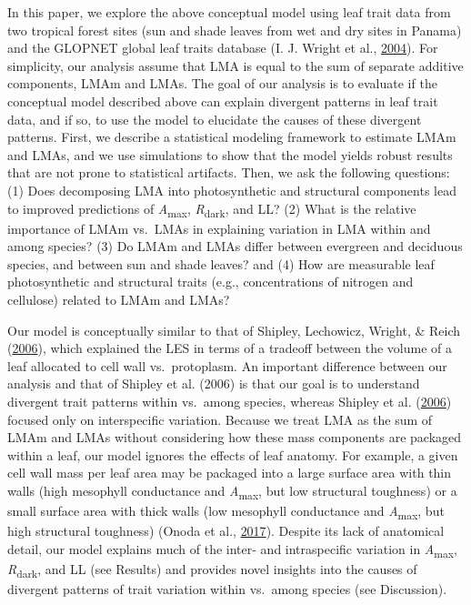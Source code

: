 \documentclass[12pt,]{article}
\theoremstyle{definition}
\theoremstyle{definition}
\theoremstyle{definition}
\theoremstyle{remark}
\begin{document}
In this paper, we explore the above conceptual model using leaf trait
data from two tropical forest sites (sun and shade leaves from wet and
dry sites in Panama) and the GLOPNET global leaf traits database (I. J.
Wright et al., \protect\hyperlink{ref-Wright2004a}{2004}). For
simplicity, our analysis assume that LMA is equal to the sum of separate
additive components, LMAm and LMAs. The goal of our analysis is to
evaluate if the conceptual model described above can explain divergent
patterns in leaf trait data, and if so, to use the model to elucidate
the causes of these divergent patterns. First, we describe a statistical
modeling framework to estimate LMAm and LMAs, and we use simulations to
show that the model yields robust results that are not prone to
statistical artifacts. Then, we ask the following questions: (1) Does
decomposing LMA into photosynthetic and structural components lead to
improved predictions of \emph{A}\textsubscript{max},
\emph{R}\textsubscript{dark}, and LL? (2) What is the relative
importance of LMAm vs.~LMAs in explaining variation in LMA within and
among species? (3) Do LMAm and LMAs differ between evergreen and
deciduous species, and between sun and shade leaves? and (4) How are
measurable leaf photosynthetic and structural traits (e.g.,
concentrations of nitrogen and cellulose) related to LMAm and LMAs?

Our model is conceptually similar to that of Shipley, Lechowicz, Wright,
\& Reich (\protect\hyperlink{ref-Shipley2006}{2006}), which explained
the LES in terms of a tradeoff between the volume of a leaf allocated to
cell wall vs.~protoplasm. An important difference between our analysis
and that of Shipley et al. (2006) is that our goal is to understand
divergent trait patterns within vs.~among species, whereas Shipley et
al. (\protect\hyperlink{ref-Shipley2006}{2006}) focused only on
interspecific variation. Because we treat LMA as the sum of LMAm and
LMAs without considering how these mass components are packaged within a
leaf, our model ignores the effects of leaf anatomy. For example, a
given cell wall mass per leaf area may be packaged into a large surface
area with thin walls (high mesophyll conductance and
\emph{A}\textsubscript{max}, but low structural toughness) or a small
surface area with thick walls (low mesophyll conductance and
\emph{A}\textsubscript{max}, but high structural toughness) (Onoda et
al., \protect\hyperlink{ref-Onoda2017}{2017}). Despite its lack of
anatomical detail, our model explains much of the inter- and
intraspecific variation in \emph{A}\textsubscript{max},
\emph{R}\textsubscript{dark}, and LL (see Results) and provides novel
insights into the causes of divergent patterns of trait variation within
vs.~among species (see Discussion).
\end{document}
